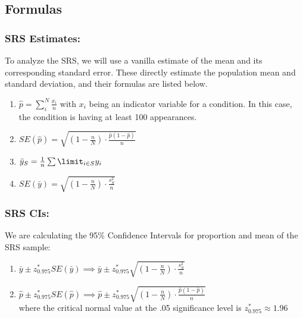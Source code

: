 \documentclass[paper=a4, fontsize=12pt,twoside]{article}	%
\begin{document}
\subsection{Formulas}
\subsubsection{SRS Estimates:}
To analyze the SRS, we will use a vanilla estimate of the mean and its corresponding standard error.  These directly estimate the population mean and standard deviation, and their formulas are listed below.
\begin{enumerate}
    \item $\hat{p}=\sum_i^N \frac{x_i}{n}$ with $x_i$ being an indicator variable for a condition.  In this case, the condition is having at least 100 appearances.
    \item $SE(\hat{p})=\sqrt{(1-\frac{n}{N}) \cdot\frac{\hat{p}(1-\hat{p})}{n}}$
    \item $\bar{y}_S=\frac{1}{n}\sum\limit_{i \in S}y_i$
    \item $SE(\bar{y})=\sqrt{(1-\frac{n}{N})\cdot \frac{s^2_S}{n}}$
\end{enumerate}


\subsubsection{SRS CIs:}
We are calculating the 95\% Confidence Intervals for proportion and mean of the SRS sample:
\begin{enumerate}
    \item $\bar{y} \pm z^*_{0.975}SE(\bar{y}) \implies \bar{y} \pm z^*_{0.975}\sqrt{(1-\frac{n}{N})\cdot \frac{s^2_S}{n}}$
    \item $\hat{p} \pm z^*_{0.975}SE(\hat{p}) \implies \hat{p} \pm z^*_{0.975}\sqrt{(1-\frac{n}{N}) \cdot\frac{\hat{p}(1-\hat{p})}{n}}$\\

where the critical normal value at the .05 significance level is $z^*_{0.975} \approx 1.96$
\end{enumerate}
\end{document}
